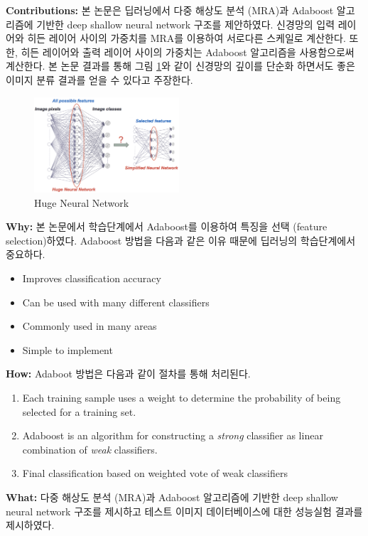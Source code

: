 \documentclass[twocolumn]{article}
\newcommand{\bi}{\begin{itemize}}
\newcommand{\ei}{\end{itemize}}
\newcommand{\be}{\begin{enumerate}}
\newcommand{\ee}{\end{enumerate}}
\newcommand{\ii}{\item}
\begin{document}
\noindent
\textbf{Contributions:}  본 논문은 딥러닝에서 다중 해상도 분석 (MRA)과 Adaboost 알고리즘에 기반한  deep shallow neural network 구조를 제안하였다.  신경망의 입력 레이어와 히든 레이어 사이의 가중치를 MRA를 이용하여 서로다른 스케일로 계산한다. 또한, 히든 레이어와 출력 레이어 사이의 가중치는 Adaboost 알고리즘을 사용함으로써 계산한다. 본 논문 결과를 통해 그림 \ref{fig:neuralnetwork}와 같이 신경망의 깊이를 단순화 하면서도 좋은 이미지 분류 결과를 얻을 수 있다고 주장한다.

\begin{figure}[htb]
        \centering
        \includegraphics[width=0.48\textwidth]{neural-network.png}
        \caption{Huge Neural Network}
        \label{fig:neuralnetwork}
\end{figure}

\noindent
\textbf{Why:}  본 논문에서 학습단계에서 Adaboost를 이용하여 특징을 선택 (feature selection)하였다. Adaboost 방법을 다음과 같은 이유 때문에 딥러닝의 학습단계에서 중요하다.
\bi
\ii Improves classification accuracy
\ii Can be used with many different classifiers
\ii Commonly used in many areas
\ii Simple to implement
\ei

\noindent
\textbf{How:}  Adaboot 방법은 다음과 같이 절차를 통해 처리된다.
\be
\ii Each training sample uses a weight to determine the probability of being selected for
    a training set.
\ii Adaboost is an algorithm for constructing a \textit{strong} classifier as linear combination of \textit{weak} classifiers.
\ii Final classification based on weighted vote of weak classifiers
\ee

\noindent
\textbf{What:} 다중 해상도 분석 (MRA)과 Adaboost 알고리즘에 기반한  deep shallow neural network 구조를 제시하고 테스트 이미지 데이터베이스에 대한 성능실험 결과를 제시하였다.

%
%
%
\end{document}

